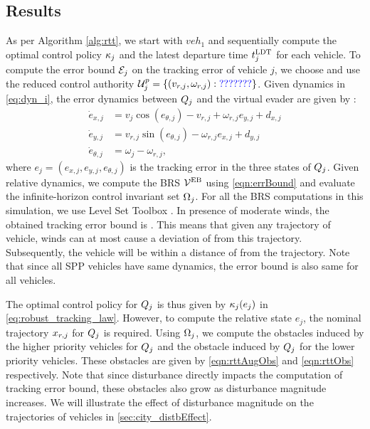 \subsection{Results \label{sec:city_simResults}}
As per Algorithm \ref{alg:rtt}, we start with $veh_1$ and sequentially compute the optimal control policy $\kappa_j$ and the latest departure time $t^\text{LDT}_j$ for each vehicle. To compute the error bound $\mathcal{E}_j$ on the tracking error of vehicle $j$, we choose  and use the reduced control authority $\mathcal{U}^p_j = \{(v_{r,j}, \omega_{r,j}): \textcolor{blue}{???????}\}$. Given dynamics in \eqref{eq:dyn_i}, the error dynamics between $Q_j$ and the virtual evader are given by \cite{Mitchell05}:
\begin{equation}
\label{eq:reldyn}
\begin{aligned}
\dot{e}_{x,j} &= v_{j} \cos(e_{\theta,j}) - v_{r,j} + \omega_{r,j}{e}_{y,j} + d_{x,j}\\
\dot{e}_{y,j} &= v_{r,j}\sin(e_{\theta,j}) - \omega_{r,j}{e}_{x,j} + d_{y,j}\\
\dot{e}_{\theta,j} &= \omega_{j} - \omega_{r,j},
\end{aligned}
\end{equation}    
where $e_j = ({e}_{x,j}, {e}_{y,j}, {e}_{\theta,j})$ is the tracking error in the three states of $Q_j$. Given relative dynamics, we compute the BRS $\mathcal{V}^{\text{EB}}$ using \eqref{eqn:errBound} and evaluate the infinite-horizon control invariant set $\Omega_j$. For all the BRS computations in this simulation, we use Level Set Toolbox \cite{Mitchell07b}. In presence of moderate winds, the obtained tracking error bound is . This means that given any trajectory of vehicle, winds can at most cause a deviation of  from this trajectory. Subsequently, the vehicle will be within a distance of  from the trajectory. Note that since all SPP vehicles have same dynamics, the error bound is also same for all vehicles. 

The optimal control policy for $Q_j$ is thus given by $\kappa_j(e_j)$ in \eqref{eq:robust_tracking_law}. However, to compute the relative state $e_j$, the nominal trajectory $x_{r,j}$ for $Q_j$ is required. Using $\Omega_j$, we compute the obstacles induced by the higher priority vehicles for $Q_j$ and the obstacle induced by $Q_j$ for the lower priority vehicles. These obstacles are given by \eqref{eqn:rttAugObs} and \eqref{eqn:rttObs} respectively. Note that since disturbance directly impacts the computation of tracking error bound, these obstacles also grow as disturbance magnitude increases. We will illustrate the effect of disturbance magnitude on the trajectories of vehicles in \ref{sec:city_distbEffect}.

